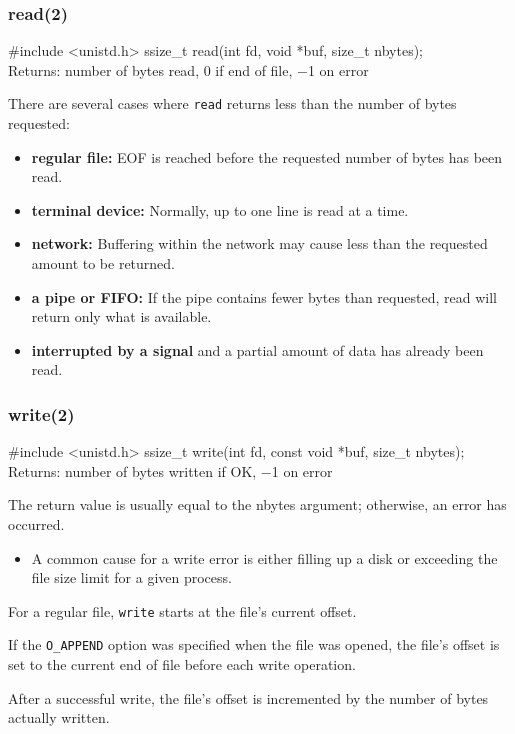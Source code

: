 \documentclass[newPxFont,sthlmFooter,nooffset]{beamer}
\begin{document}
\begin{frame}[containsverbatim,t]
  \frametitle{read(2)}
\begin{codedef}
#include <unistd.h>
ssize_t read(int fd, void *buf, size_t nbytes); \\ Returns: number of bytes read, 0 if end of file, −1 on error
\end{codedef}

There are several cases where \texttt{read} returns less than the number of bytes requested:
\begin{itemize}
\item \textbf{regular file:} EOF is reached before the requested number of bytes has been read.
\item \textbf{terminal device:} Normally, up to one line is read at a time.
\item \textbf{network: } Buffering within the network may cause less than the requested amount to be returned.
\item \textbf{a pipe or FIFO:} If the pipe contains fewer bytes than requested, read will return only what is available.
\item \textbf{interrupted by a signal} and a partial amount of data has already been read.
\end{itemize}

\end{frame}



\begin{frame}[containsverbatim,t]
  \frametitle{write(2)}
\begin{codedef}
#include <unistd.h>
ssize_t write(int fd, const void *buf, size_t nbytes); \\ Returns: number of bytes written if OK, −1 on error
\end{codedef}

The return value is usually equal to the nbytes argument; otherwise, an error has occurred.
\begin{itemize}
  \item A common cause for a write error is either filling up a disk or exceeding the file size limit for a given process.
\end{itemize}
\bigskip

For a regular file, \texttt{write} starts at the file’s current offset.
\bigskip

If the \texttt{O\_APPEND} option was specified when the file was opened, the file’s offset is set to the current end of file before each write operation.
\bigskip

After a successful write, the file’s offset is incremented by the number of bytes actually written.
\end{frame}
\end{document}
